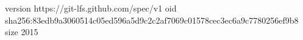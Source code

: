 version https://git-lfs.github.com/spec/v1
oid sha256:83edb9a3060514c05ed596a5d9c2c2af7069c01578cec3ec6a9c7780256ef9b8
size 2015
